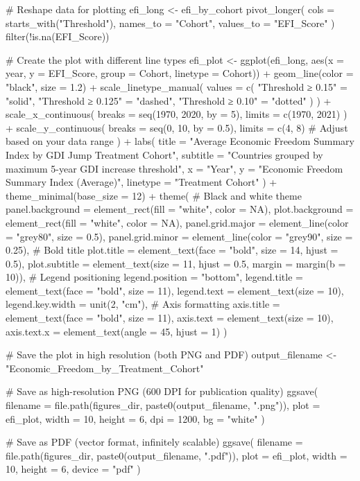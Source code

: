 {{# Reshape data for plotting
efi_long <- efi_by_cohort %
  pivot_longer(
    cols = starts_with("Threshold"),
    names_to = "Cohort",
    values_to = "EFI_Score"
  ) %
  filter(!is.na(EFI_Score))

# Create the plot with different line types
efi_plot <- ggplot(efi_long, aes(x = year, y = EFI_Score, group = Cohort, linetype = Cohort)) +
  geom_line(color = "black", size = 1.2) +
  scale_linetype_manual(
    values = c(
      "Threshold ≥ 0.15" = "solid",
      "Threshold ≥ 0.125" = "dashed",
      "Threshold ≥ 0.10" = "dotted"
    )
  ) +
  scale_x_continuous(
    breaks = seq(1970, 2020, by = 5),
    limits = c(1970, 2021)
  ) +
  scale_y_continuous(
    breaks = seq(0, 10, by = 0.5),
    limits = c(4, 8)  # Adjust based on your data range
  ) +
  labs(
    title = "Average Economic Freedom Summary Index by GDI Jump Treatment Cohort",
    subtitle = "Countries grouped by maximum 5-year GDI increase threshold",
    x = "Year",
    y = "Economic Freedom Summary Index (Average)",
    linetype = "Treatment Cohort"
  ) +
  theme_minimal(base_size = 12) +
  theme(
    # Black and white theme
    panel.background = element_rect(fill = "white", color = NA),
    plot.background = element_rect(fill = "white", color = NA),
    panel.grid.major = element_line(color = "grey80", size = 0.5),
    panel.grid.minor = element_line(color = "grey90", size = 0.25),
    # Bold title
    plot.title = element_text(face = "bold", size = 14, hjust = 0.5),
    plot.subtitle = element_text(size = 11, hjust = 0.5, margin = margin(b = 10)),
    # Legend positioning
    legend.position = "bottom",
    legend.title = element_text(face = "bold", size = 11),
    legend.text = element_text(size = 10),
    legend.key.width = unit(2, "cm"),
    # Axis formatting
    axis.title = element_text(face = "bold", size = 11),
    axis.text = element_text(size = 10),
    axis.text.x = element_text(angle = 45, hjust = 1)
  )

# Save the plot in high resolution (both PNG and PDF)
output_filename <- "Economic_Freedom_by_Treatment_Cohort"

# Save as high-resolution PNG (600 DPI for publication quality)
ggsave(
  filename = file.path(figures_dir, paste0(output_filename, ".png")),
  plot = efi_plot,
  width = 10,
  height = 6,
  dpi = 1200,
  bg = "white"
)

# Save as PDF (vector format, infinitely scalable)
ggsave(
  filename = file.path(figures_dir, paste0(output_filename, ".pdf")),
  plot = efi_plot,
  width = 10,
  height = 6,
  device = "pdf"
)

}}
